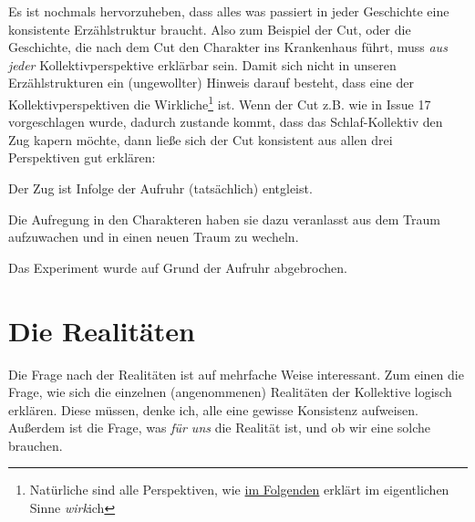 \documentclass[12pt, a4paper, openany]{report}
\let\tempone\itemize
\let\temptwo\enditemize
\renewenvironment{itemize}{\tempone\addtolength{\itemsep}{-0.5\baselineskip}}{\temptwo}
\begin{document}
Es ist nochmals hervorzuheben, dass alles was passiert in jeder Geschichte eine konsistente Erzählstruktur braucht. 
Also zum Beispiel der Cut, oder die Geschichte, die nach dem Cut den Charakter ins Krankenhaus führt, muss \emph{aus jeder} Kollektivperspektive erklärbar sein.
Damit sich nicht in unseren Erzählstrukturen ein (ungewollter) Hinweis darauf besteht, dass eine der Kollektivperspektiven die Wirkliche\footnote{Natürliche sind alle Perspektiven, wie \hyperref[realitaeten]{im Folgenden} erklärt im eigentlichen Sinne \emph{wirk}ich} ist.
Wenn der Cut z.B. wie in Issue 17 vorgeschlagen wurde, dadurch zustande kommt, dass das Schlaf-Kollektiv den Zug kapern möchte, dann ließe sich der Cut konsistent aus allen drei Perspektiven gut erklären:
\begin{itemize}
    \item[Realität] Der Zug ist Infolge der Aufruhr (tatsächlich) entgleist.
    \item[Somnum] Die Aufregung in den Charakteren haben sie dazu
      veranlasst aus dem Traum aufzuwachen und in einen neuen Traum zu wecheln.
    \item[Experiment] Das Experiment wurde auf Grund der Aufruhr abgebrochen.
\end{itemize}

\section{Die Realitäten}\label{realitaeten}
Die Frage nach der Realitäten ist auf mehrfache Weise interessant. 
Zum einen die Frage, wie sich die einzelnen (angenommenen) Realitäten der Kollektive logisch erklären. 
Diese müssen, denke ich, alle eine gewisse Konsistenz aufweisen.
Außerdem ist die Frage, was \emph{für uns} die Realität ist, und ob wir eine solche brauchen.\\
\end{document}
